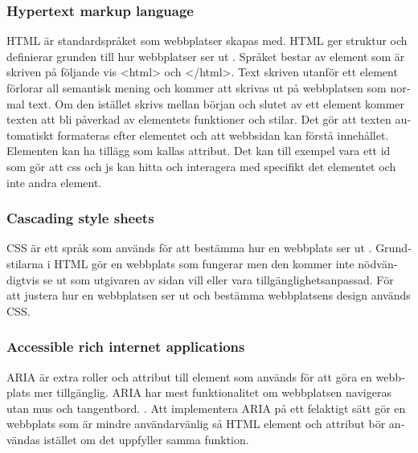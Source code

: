 \documentclass[11p]{article}
\begin{document}
\begin{otherlanguage}{swedish}
    \subsubsection{Hypertext markup language}
    HTML är standardspråket som webbplatser skapas med.
    HTML ger struktur och definierar grunden till hur webbplatser ser ut \parencite{HTML}.
    Språket bestar av element som är skriven på följande vis <html> och </html>.
    Text skriven utanför ett element förlorar all semantisk mening och kommer att skrivas ut på webbplatsen som normal text.
    Om den istället skrivs mellan början och slutet av ett element kommer texten att bli påverkad av elementets funktioner och stilar.
    Det gör att texten automatiskt formateras efter elementet och att webbsidan kan förstå innehållet.
    Elementen kan ha tillägg som kallas attribut.
    Det kan till exempel vara ett id som gör att css och js kan hitta och interagera med specifikt det elementet och inte andra element.


    \subsubsection{Cascading style sheets}
    CSS är ett språk som används för att bestämma hur en webbplats ser ut \parencite{CSS}.
    Grundstilarna i HTML gör en webbplats som fungerar men den kommer inte nödvändigtvis se ut som utgivaren av sidan vill eller vara tillgänglighetsanpassad.
    För att justera hur en webbplatsen ser ut och bestämma webbplatsens design används CSS.

    \subsubsection{Accessible rich internet applications}
    ARIA är extra roller och attribut till element som används för att göra en webbplats mer tillgänglig.
    ARIA har mest funktionalitet om webbplatsen navigeras utan mus och tangentbord. \parencite{ARIA}.
    Att implementera ARIA på ett felaktigt sätt gör en webbplats som är mindre användarvänlig så HTML element och attribut bör användas istället om det uppfyller samma funktion.
    

\end{otherlanguage}
\end{document}
